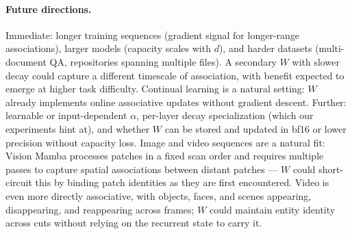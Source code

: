 \documentclass{article}
\begin{document}
\paragraph{Future directions.}
Immediate: longer training sequences (gradient signal for longer-range associations), larger models (capacity scales with $d$), and harder datasets (multi-document QA, repositories spanning multiple files). A secondary $W$ with slower decay could capture a different timescale of association, with benefit expected to emerge at higher task difficulty. Continual learning is a natural setting: $W$ already implements online associative updates without gradient descent. Further: learnable or input-dependent $\alpha$, per-layer decay specialization (which our experiments hint at), and whether $W$ can be stored and updated in bf16 or lower precision without capacity loss. Image and video sequences are a natural fit: Vision Mamba processes patches in a fixed scan order and requires multiple passes to capture spatial associations between distant patches --- $W$ could short-circuit this by binding patch identities as they are first encountered. Video is even more directly associative, with objects, faces, and scenes appearing, disappearing, and reappearing across frames; $W$ could maintain entity identity across cuts without relying on the recurrent state to carry it.
\end{document}
